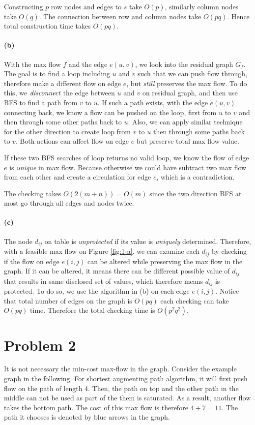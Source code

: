 \documentclass[12pt]{article}
\begin{document}
Constructing $p$ row nodes and edges to $s$ take $O(p)$, similarly column nodes take $O(q)$. The connection between row and column nodes take $O(pq)$. Hence total construction time takes $O(pq)$. 

\paragraph{(b)}
With the max flow $f$ and the edge $e(u, v)$, we look into the residual graph $G_f$. The goal is to find a loop including $u$ and $v$ such that we can push flow through, therefore make a different flow on edge $e$, but \emph{still} preserves the max flow. To do this, we $\emph{disconnect}$ the edge between $u$ and $v$ on residual graph, and then use BFS to find a path from $v$ to $u$. If such a path exists, with the edge $e(u,v)$ connecting back, we know a flow can be pushed on the loop, first from $u$ to $v$ and then through some other paths back to $u$. Also, we can apply similar technique for the other direction to create loop from $v$ to $u$ then through some paths back to $v$. Both actions can affect flow on edge $e$ but preserve total max flow value. 

If these two BFS searches of loop returns no valid loop, we know the flow of edge $e$ is \emph{unique} in max flow. Because otherwise we could have subtract two max flow from each other and create a circulation for edge $e$, which is a contradiction. 

The checking takes $O(2(m+n)) = O(m)$ since the two direction BFS at most go through all edges and nodes twice.

\paragraph{(c)} The node $d_{ij}$ on table is \emph{unprotected} if its value is \emph{uniquely} determined. Therefore, with a feasible max flow on Figure \ref{fig:1-a}. we can examine each $d_{ij}$ by checking if the flow on edge $e(i,j)$ can be altered while preserving the max flow in the graph. If it can be altered, it means there can be different possible value of $d_{ij}$ that results in same disclosed set of values, which therefore means $d_{ij}$ is protected. To do so, we use the algorithm in (b) on each edge $e(i,j)$. Notice that total number of edges on the graph is $O(pq)$ each checking can take $O(pq)$ time. Therefore the total checking time is $O(p^2q^2)$.

\pagebreak

\section*{Problem 2}
It is not necessary the min-cost max-flow in the graph. Consider the example graph in the following. For shortest augmenting path algorithm, it will first push flow on the path of length 4. Then, the path on top and the other path in the middle can not be used as part of the them is saturated. As a result, another flow takes the bottom path. The cost of this max flow is therefore $4+7=11$. The path it chooses is denoted by blue arrows in the graph. 
\end{document}

